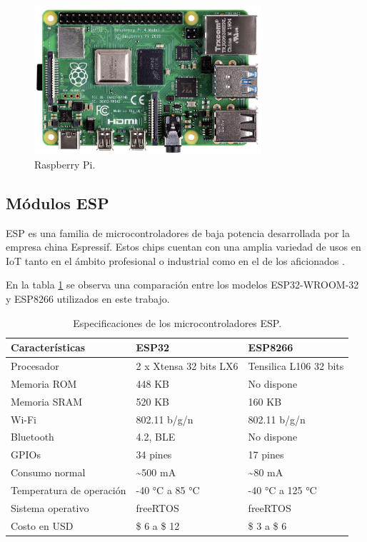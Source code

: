 \begin{figure}[h]
	\centering
	\includegraphics[width=0.75\textwidth]{./Figures/rpi.png}
	\caption[Raspberry Pi]{Raspberry Pi\protect\footnotemark.}
	\label{fig:rpi}

\end{figure}
\subsection{Módulos ESP}
\label{sec:Módulos ESP}
ESP es una familia de microcontroladores de baja potencia  desarrollada por la empresa china Espressif. Estos chips cuentan con una amplia variedad de usos en IoT tanto en el ámbito profesional o industrial como en el de los aficionados \citep{esp32} \citep{esp8266}. 

En la tabla \ref{tab:esp} se observa una comparación entre los modelos ESP32-WROOM-32 y ESP8266 utilizados en este trabajo.





\begin{table}[h]
\centering
\caption[Especificaciones de los microcontroladores ESP]{Especificaciones de los microcontroladores ESP.}

\begin{tabular} {p{4.5cm} p{3.7cm} p{3.7cm}} 
\toprule
\textbf{Características} & \textbf{ESP32} \citep{esp32}  & \textbf{ESP8266} \citep{esp8266} \\
\midrule
Procesador		& 2 x Xtensa 32 bits LX6	& Tensilica L106 32 bits\\
Memoria ROM	 	& 448 KB	& No dispone\\	
Memoria SRAM	& 520 KB	& 160 KB\\
Wi-Fi			& 802.11 b/g/n & 802.11 b/g/n\\
Bluetooth		& 4.2, BLE & No dispone\\
GPIOs			& 34 pines & 17 pines\\
Consumo normal	& \textasciitilde 500 mA & \textasciitilde 80 mA \\
Temperatura de operación		& -40 °C a 85 °C & -40 °C a 125 °C \\
Sistema operativo &	freeRTOS	& freeRTOS \\
Costo en USD	& \$ 6 a \$ 12  & \$ 3 a  \$ 6 \\
\bottomrule
\hline
\end{tabular}
\label{tab:esp}
\end{table}

